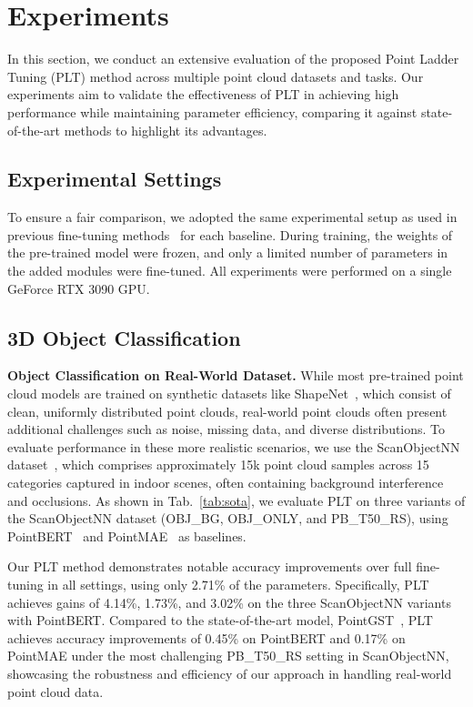 

\section{Experiments}
\label{sec:experiments}
In this section, we conduct an extensive evaluation of the proposed Point Ladder Tuning (PLT) method across multiple point cloud datasets and tasks. Our experiments aim to validate the effectiveness of PLT in achieving high performance while maintaining parameter efficiency, comparing it against state-of-the-art methods to highlight its advantages.
\subsection{Experimental Settings}
To ensure a fair comparison, we adopted the same experimental setup as used in previous fine-tuning methods~\cite{zha2023instance, zhou2024dynamic} for each baseline. During training, the weights of the pre-trained model were frozen, and only a limited number of parameters in the added modules were fine-tuned. All experiments were performed on a single GeForce RTX 3090 GPU.

\subsection{3D Object Classification}
\label{sec:classification}
\textbf{Object Classification on Real-World Dataset.} While most pre-trained point cloud models are trained on synthetic datasets like ShapeNet~\cite{chang2015shapenet}, which consist of clean, uniformly distributed point clouds, real-world point clouds often present additional challenges such as noise, missing data, and diverse distributions. To evaluate performance in these more realistic scenarios, we use the ScanObjectNN dataset~\cite{uy2019revisiting}, which comprises approximately 15k point cloud samples across 15 categories captured in indoor scenes, often containing background interference and occlusions. As shown in Tab.~\ref{tab:sota}, we evaluate PLT on three variants of the ScanObjectNN dataset (OBJ\_BG, OBJ\_ONLY, and PB\_T50\_RS), using PointBERT~\cite{yu2022point} and PointMAE~\cite{pang2022masked} as baselines.

Our PLT method demonstrates notable accuracy improvements over full fine-tuning in all settings, using only 2.71\% of the parameters. Specifically, PLT achieves gains of 4.14\%, 1.73\%, and 3.02\% on the three ScanObjectNN variants with PointBERT. Compared to the state-of-the-art model, PointGST~\cite{liang2024parameter}, PLT achieves accuracy improvements of 0.45\% on PointBERT and 0.17\% on PointMAE under the most challenging PB\_T50\_RS setting in ScanObjectNN, showcasing the robustness and efficiency of our approach in handling real-world point cloud data.


